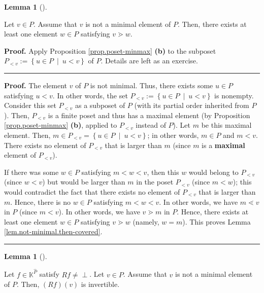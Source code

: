 \documentclass[numbers=enddot,12pt,final,onecolumn,notitlepage]{scrartcl}%
\theoremstyle{definition}
\newtheorem{lem}[theo]{Lemma}
\newenvironment{lemma}[1][]
{\begin{lem}[#1]\begin{leftbar}}
{\end{leftbar}\end{lem}}
\newenvironment{verlong}{}{}
\newenvironment{vershort}{}{}
\newcommand{\undf}{\operatorname*{\bot}}
\newenvironment{proof}[1][Proof]{\noindent\textbf{#1.} }{\ \rule{0.5em}{0.5em}}
\begin{document}
\begin{lemma}
\label{lem.not-minimal.then-covered}Let $v\in P$. Assume that $v$ is not a
minimal element of $P$. Then, there exists at least one element $w\in P$
satisfying $v\gtrdot w$.
\end{lemma}

\begin{vershort}
\begin{proof}
Apply Proposition \ref{prop.poset-minmax} \textbf{(b)} to the subposet
$P_{<v}:=\left\{  u\in P\ \mid\ u<v\right\}  $ of $P$. Details are left as an exercise.
\end{proof}
\end{vershort}

\begin{verlong}
\begin{proof}
The element $v$ of $P$ is not minimal. Thus, there exists some $u\in P$
satisfying $u<v$. In other words, the set $P_{<v}:=\left\{  u\in
P\ \mid\ u<v\right\}  $ is nonempty. Consider this set $P_{<v}$ as a subposet
of $P$ (with its partial order inherited from $P$). Then, $P_{<v}$ is a finite
poset and thus has a maximal element (by Proposition \ref{prop.poset-minmax}
\textbf{(b)}, applied to $P_{<v}$ instead of $P$). Let $m$ be this maximal
element. Then, $m\in P_{<v}=\left\{  u\in P\ \mid\ u<v\right\}  $; in other
words, $m\in P$ and $m<v$. There exists no element of $P_{<v}$ that is larger
than $m$ (since $m$ is a \textbf{maximal} element of $P_{<v}$).

If there was some $w\in P$ satisfying $m<w<v$, then this $w$ would belong to
$P_{<v}$ (since $w<v$) but would be larger than $m$ in the poset $P_{<v}$
(since $m<w$); this would contradict the fact that there exists no element of
$P_{<v}$ that is larger than $m$. Hence, there is no $w\in P$ satisfying
$m<w<v$. In other words, we have $m\lessdot v$ in $P$ (since $m<v$). In other
words, we have $v\gtrdot m$ in $P$. Hence, there exists at least one element
$w\in P$ satisfying $v\gtrdot w$ (namely, $w=m$). This proves Lemma
\ref{lem.not-minimal.then-covered}.
\end{proof}
\end{verlong}

\begin{lemma}
\label{lem.R.inv-not-min}Let $f\in\mathbb{K}^{\widehat{P}}$ satisfy
$Rf\neq\undf$. Let $v\in P$. Assume that $v$ is not a minimal element of $P$.
Then, $\left(  Rf\right)  \left(  v\right)  $ is invertible.
\end{lemma}
\end{document}
